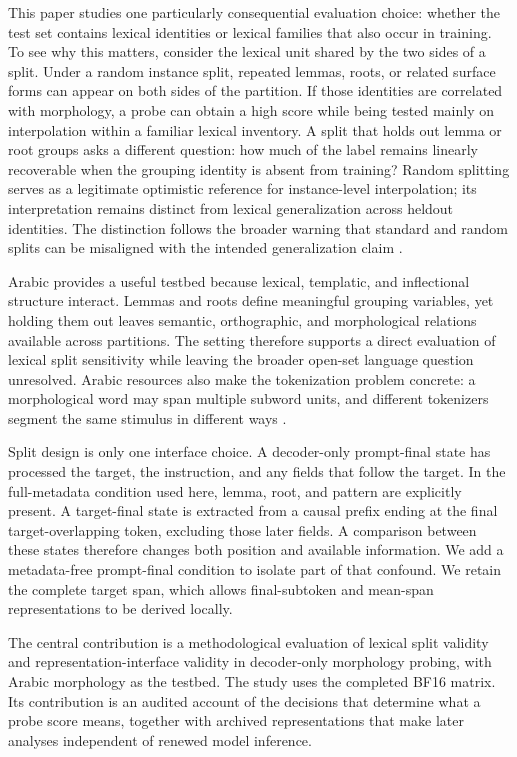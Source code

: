 \documentclass[pdflatex,sn-basic]{sn-jnl}
\begin{document}
This paper studies one particularly consequential evaluation choice: whether
the test set contains lexical identities or lexical families that also occur
in training. To see why this matters, consider the lexical unit shared by the
two sides of a split. Under a random instance split, repeated lemmas, roots, or related
surface forms can appear on both sides of the partition. If those identities
are correlated with morphology, a probe can obtain a high score while being
tested mainly on interpolation within a familiar lexical inventory. A split
that holds out lemma or root groups asks a different question: how much of the
label remains linearly recoverable when the grouping identity is absent from
training? Random splitting serves as a legitimate optimistic reference for
instance-level interpolation; its interpretation remains distinct from lexical
generalization across heldout identities. The distinction follows the broader
warning that standard and random splits can be misaligned with the intended
generalization claim \citep{gorman-bedrick-2019,sogaard-etal-2021}.

Arabic provides a useful testbed because lexical, templatic, and inflectional
structure interact. Lemmas and roots define meaningful grouping variables, yet
holding them out leaves semantic, orthographic, and morphological relations
available across partitions. The setting therefore supports a direct
evaluation of lexical split sensitivity while leaving the broader open-set
language question unresolved. Arabic resources also make the tokenization
problem concrete: a morphological word may span multiple subword units, and
different tokenizers segment the same stimulus in different ways
\citep{taji-etal-2017,sennrich-etal-2016,
bostrom-durrett-2020}.

Split design is only one interface choice. A decoder-only prompt-final state
has processed the target, the instruction, and any fields that follow the
target. In the full-metadata condition used here, lemma, root, and pattern are
explicitly present. A target-final state is extracted from a causal prefix
ending at the final target-overlapping token, excluding those later fields. A
comparison between these states therefore changes both position and available
information. We add a metadata-free prompt-final condition to isolate part of
that confound. We retain the complete target span, which allows
final-subtoken and mean-span representations to be derived locally.

The central contribution is a methodological evaluation of lexical split
validity and representation-interface validity in decoder-only morphology
probing, with Arabic morphology as the testbed. The study uses the completed
BF16 matrix. Its contribution is an audited account of the decisions that determine what a
probe score means, together with archived representations that make later
analyses independent of renewed model inference.
\end{document}
